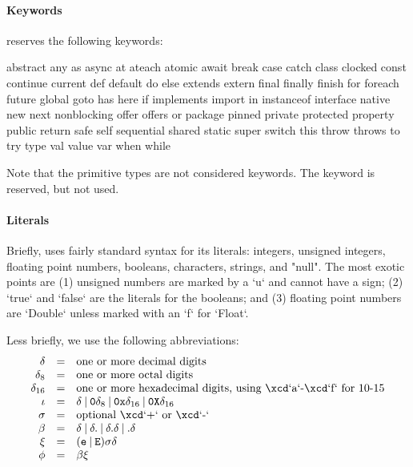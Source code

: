 \paragraph{Keywords}
\Xten{} reserves the following keywords:
\begin{xten}
abstract        any             as              async
at              ateach          atomic          await
break           case            catch           class
clocked         const           continue        current
def             default         do              else
extends         extern          final           finally
finish          for             foreach         future
global
goto            has             here            if             
implements      import          in
instanceof      interface
native          new             next            nonblocking     
offer           offers
or              package         pinned          private        
protected       property        public          return
safe            self            sequential      shared
static
super           switch          this            throw
throws          to              try             type
val             value           var             when
while
\end{xten}
Note that the primitive types are not considered keywords.
The keyword  is reserved, but not used.

\paragraph{Literals}\label{Literals}

Briefly, \XtenCurrVer{} uses fairly standard syntax for its literals:
integers, unsigned integers, floating point numbers, booleans, 
characters, strings, and \xcd"null".  The most exotic points are (1) unsigned
numbers are marked by a \xcd`u` and cannot have a sign; (2) \xcd`true` and
\xcd`false` are the literals for the booleans; and (3) floating point numbers
are \xcd`Double` unless marked with an \xcd`f` for \xcd`Float`. 

Less briefly, we use the following abbreviations: 
\begin{displaymath}
\begin{array}{rcll}
\delta &=& \mbox{one or more decimal digits}\\
\delta_8 &=& \mbox{one or more octal digits}\\
\delta_{16} &=& \mbox{one or more hexadecimal digits, using \xcd`a`-\xcd`f`
for 10-15}\\
\iota &=& \delta 
        \mathbin{|} {\tt 0} \delta_8 
        \mathbin{|} {\tt 0x} \delta_{16}
        \mathbin{|} {\tt 0X} \delta_{16}
\\
\sigma &=& \mbox{optional \xcd`+` or \xcd`-`}\\
\beta &=& \delta 
          \mathbin{|} \delta {\tt .}
          \mathbin{|} \delta {\tt .} \delta
          \mathbin{|}  {\tt .} \delta \\
\xi &=& ({\tt e } \mathbin{|} {\tt E})
         \sigma
         \delta \\
\phi &=& \beta \xi
\end{array}
\end{displaymath}

